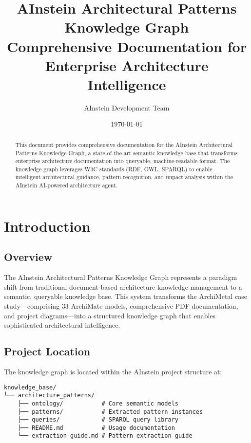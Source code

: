 \documentclass[12pt,a4paper]{article}
\title{\textbf{AInstein Architectural Patterns Knowledge Graph}\\
\large{Comprehensive Documentation for Enterprise Architecture Intelligence}}
\author{AInstein Development Team}
\date{\today}
\begin{document}
\maketitle

\begin{abstract}
This document provides comprehensive documentation for the AInstein Architectural Patterns Knowledge Graph, a state-of-the-art semantic knowledge base that transforms enterprise architecture documentation into queryable, machine-readable format. The knowledge graph leverages W3C standards (RDF, OWL, SPARQL) to enable intelligent architectural guidance, pattern recognition, and impact analysis within the AInstein AI-powered architecture agent.
\end{abstract}

\tableofcontents
\newpage

\section{Introduction}

\subsection{Overview}
The AInstein Architectural Patterns Knowledge Graph represents a paradigm shift from traditional document-based architecture knowledge management to a semantic, queryable knowledge base. This system transforms the ArchiMetal case study—comprising 33 ArchiMate models, comprehensive PDF documentation, and project diagrams—into a structured knowledge graph that enables sophisticated architectural intelligence.

\subsection{Project Location}
The knowledge graph is located within the AInstein project structure at:

\begin{verbatim}
knowledge_base/
└── architecture_patterns/
    ├── ontology/           # Core semantic models
    ├── patterns/           # Extracted pattern instances
    ├── queries/            # SPARQL query library
    ├── README.md           # Usage documentation
    └── extraction-guide.md # Pattern extraction guide
\end{verbatim}
\end{document}
